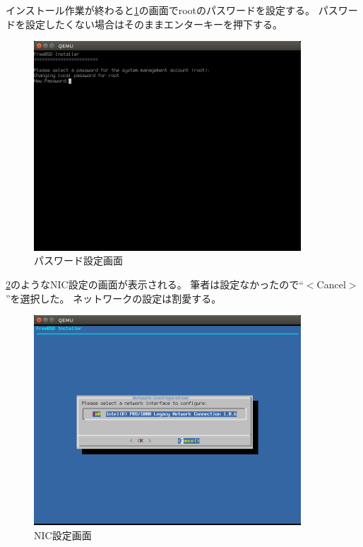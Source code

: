 \documentclass[a4j]{jarticle}
\begin{document}
\begin{multicols}{2}
インストール作業が終わると\ref{fig:FreeBSD_PASS}の画面でrootのパスワードを設定する。
パスワードを設定したくない場合はそのままエンターキーを押下する。
\begin{figure}[htbp]
	\begin{center}
    	\includegraphics[width=10cm]{./IMG/FreeBSD_ROOT_PASS.png}
	\end{center}
    \caption{パスワード設定画面}
    \label{fig:FreeBSD_PASS}
\end{figure}

\ref{fig:FreeBSD_NIC}のようなNIC設定の画面が表示される。
筆者は設定なかったので``$<$Cancel$>$''を選択した。
ネットワークの設定は割愛する。
\begin{figure}[htbp]
	\begin{center}
    	\includegraphics[width=10cm]{./IMG/FreeBSD_NIC.png}
	\end{center}
    \caption{NIC設定画面}
    \label{fig:FreeBSD_NIC}
\end{figure}


\end{multicols}
\end{document}
